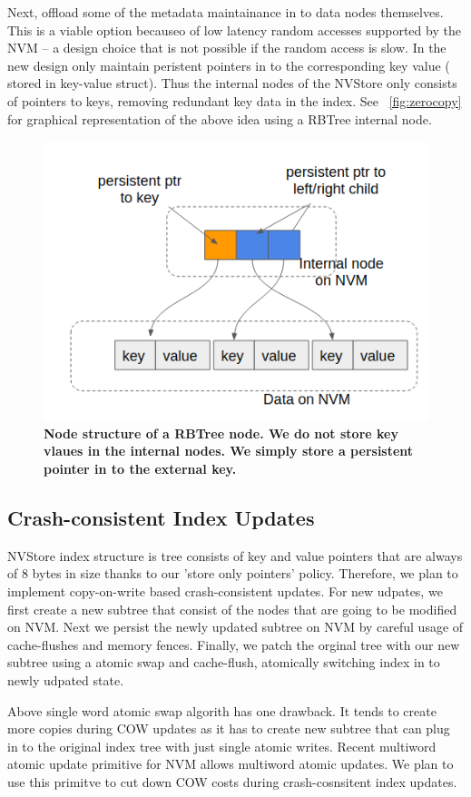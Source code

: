 Next, offload some of the metadata maintainance in to data nodes themselves. This is a viable
option becauseo of low latency random accesses supported by the NVM -- a design choice that
is not possible if the random access is slow. In the new design only maintain peristent pointers
in to the corresponding key value ( stored in key-value struct). Thus the internal nodes of the 
NVStore only consists of pointers to keys, removing redundant key data in the index. 
See ~\autoref{fig:zerocopy} for graphical representation of the above idea using a RBTree internal
node.

\begin{figure}[]   
	\centering
	\includegraphics[width=\linewidth]{figures/zerocopy.png} 
	\caption{\bf Node structure of a RBTree node. We do not store key vlaues in the internal nodes. We simply
	store a persistent pointer in to the external key.} 
	\label{fig:zerocopy} 
\end{figure}

\subsection{Crash-consistent Index Updates}
NVStore index structure is tree consists of key and value pointers that are always of 8 bytes in size
thanks to our 'store only pointers' policy. Therefore, we plan to implement copy-on-write based 
crash-consistent updates. For new udpates, we first create a new subtree that consist of the nodes
that are going to be modified on NVM. Next we persist the newly updated subtree on NVM by careful
usage of cache-flushes and memory fences. Finally, we patch the orginal tree with our new subtree
using a atomic swap and cache-flush, atomically switching index in to newly udpated state.

Above single word atomic swap algorith has one drawback. It tends to create more copies during
COW updates as it has to create new subtree that can plug in to the original index tree with just 
single atomic writes. Recent multiword atomic update primitive\cite{pmwcas} for NVM allows multiword 
atomic updates. We plan to use this primitve to cut down COW costs during crash-cosnsitent index updates.




